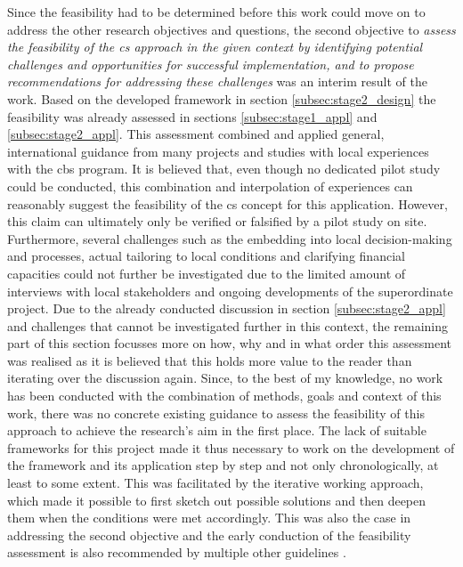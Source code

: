 Since the feasibility had to be determined before this work could move on to address the other research objectives and questions, the second objective to \textit{assess the feasibility of the \acrlong{cs} approach in the given context by identifying potential challenges and opportunities for successful implementation, and to propose recommendations for addressing these challenges} was an interim result of the work. Based on the developed framework in section \ref{subsec:stage2_design} the feasibility was already assessed in sections \ref{subsec:stage1_appl} and \ref{subsec:stage2_appl}. This assessment combined and applied general, international guidance from many projects and studies with local experiences with the \acrshort{cbs} program. It is believed that, even though no dedicated pilot study could be conducted, this combination and interpolation of experiences can reasonably suggest the feasibility of the \acrshort{cs} concept for this application. However, this claim can ultimately only be verified or falsified by a pilot study on site. Furthermore, several challenges such as the embedding into local decision-making and processes, actual tailoring to local conditions and clarifying financial capacities could not further be investigated due to the limited amount of interviews with local stakeholders and ongoing developments of the superordinate project.\newline
Due to the already conducted discussion in section \ref{subsec:stage2_appl} and challenges that cannot be investigated further in this context, the remaining part of this section focusses more on how, why and in what order this assessment was realised as it is believed that this holds more value to the reader than iterating over the discussion again.\newline
Since, to the best of my knowledge, no work has been conducted with the combination of methods, goals and context of this work, there was no concrete existing guidance to assess the feasibility of this approach to achieve the research's aim in the first place. The lack of suitable frameworks for this project made it thus necessary to work on the development of the framework and its application step by step and not only chronologically, at least to some extent. This was facilitated by the iterative working approach, which made it possible to first sketch out possible solutions and then deepen them when the conditions were met accordingly. This was also the case in addressing the second objective and the early conduction of the feasibility assessment is also recommended by multiple other guidelines \autocite{citizenscience.govBasicStepsYour,garciaFindingWhatYou2021,ifrcCommunityBasedSurveillanceGuiding2017,ifrcFbFPractitionersManual2023b,minkmanCitizenScienceWater2015}.\newline
